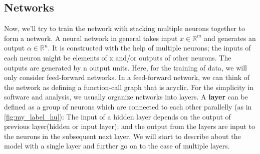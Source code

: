 
\subsection{Networks}


Now, we’ll try to train the network with stacking multiple neurons together to form a network. A neural network in general takes input $x \in \mathbb{R}^m$ and generates an output $\alpha \in \mathbb{R}^n $.  It is constructed with the help of multiple neurons; the inputs of each neuron might be elements of x and/or outputs of other neurons. The outputs are generated by n output units.
Here, for the training of data, we will only consider feed-forward networks. In a feed-forward network, we can think of the network as defining a function-call graph that is acyclic. For the simplicity in software and analysis, we usually organize networks into layers. A \textbf{layer} can be defined as a group of neurons which are connected to each other parallelly (as in \autoref{fig:my_label_hu}): The input of a hidden layer depends on the output of previous layer(hidden or input layer); and the output from the layers are input to the neurons in the subsequent next layer. We will start to describe about the model with a single layer and further go on to the case of multiple layers.

